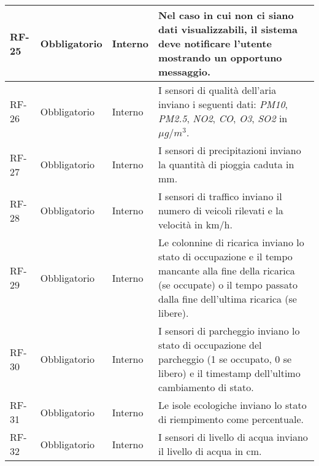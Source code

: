 \begin{longtable}{|>{\centering\arraybackslash}m{}|>{\centering\arraybackslash}m{}|>{\centering\arraybackslash}m{}|>{\centering\arraybackslash}m{}|}
	\\\hline
	RF-25           & Obbligatorio        & Interno                                                                                                           & Nel caso in cui non ci siano dati visualizzabili, il sistema deve notificare l'utente mostrando un opportuno messaggio.
	\\\hline
	RF-26           & Obbligatorio        & Interno                                                                                                           & I sensori di qualità dell'aria inviano i seguenti dati: \textit{PM10}, \textit{PM2.5}, \textit{NO2}, \textit{CO}, \textit{O3}, \textit{SO2} in $\mu g/m^3$.
	\\\hline
	RF-27           & Obbligatorio        & Interno                                                                                                           & I sensori di precipitazioni inviano la quantità di pioggia caduta in mm.
	\\\hline
	RF-28           & Obbligatorio        & Interno                                                                                                           & I sensori di traffico inviano il numero di veicoli rilevati e la velocità in km/h.
	\\\hline
	RF-29           & Obbligatorio        & Interno                                                                                                           & Le colonnine di ricarica inviano lo stato di occupazione e il tempo mancante alla fine della ricarica (se occupate) o il tempo passato dalla fine dell'ultima ricarica (se libere).
	\\\hline
	RF-30           & Obbligatorio        & Interno                                                                                                           & I sensori di parcheggio inviano lo stato di occupazione del parcheggio (1 se occupato, 0 se libero) e il timestamp dell'ultimo cambiamento di stato.
	\\\hline
	RF-31           & Obbligatorio        & Interno                                                                                                           & Le isole ecologiche inviano lo stato di riempimento come percentuale.
	\\\hline
	RF-32           & Obbligatorio        & Interno                                                                                                           & I sensori di livello di acqua inviano il livello di acqua in cm.
	\\\hline

\end{longtable}
